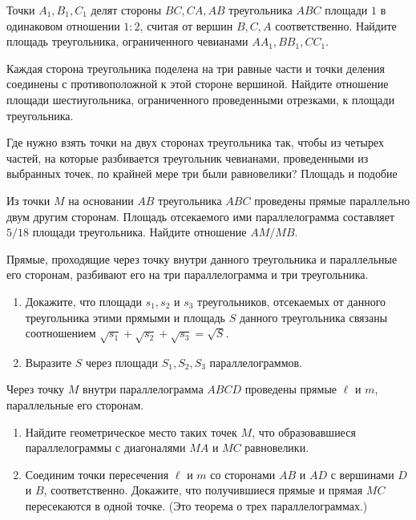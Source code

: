\documentclass{article}
\begin{document}
\begin{enumerate_boxed}
        \item Точки $A_1, B_1, C_1$ делят стороны $BC, CA, AB$ треугольника $ABC$ площади $1$ в одинаковом отношении $1:2$, считая от вершин $B, C, A$ соответственно.
        Найдите площадь треугольника, ограниченного чевианами $AA_1, BB_1, CC_1$.
        \item Каждая сторона треугольника поделена на три равные части и точки деления соединены с противоположной к этой стороне вершиной.
        Найдите отношение площади шестиугольника, ограниченного проведенными отрезками, к площади треугольника.
        \item Где нужно взять точки на двух сторонах треугольника так, чтобы из четырех частей, на которые разбивается треугольник чевианами, проведенными из выбранных точек, по крайней мере три были равновелики?
        Площадь и подобие
        \item Из точки $M$ на основании $AB$ треугольника $ABC$ проведены прямые параллельно двум другим сторонам.
        Площадь отсекаемого ими параллелограмма составляет $5/18$ площади треугольника.
        Найдите отношение $AM/MB$.
        \item Прямые, проходящие через точку внутри данного треугольника и параллельные его сторонам, разбивают его на три параллелограмма и три треугольника.
        \begin{enumerate}
            \item Докажите, что площади $s_1, s_2$ и $s_3$ треугольников, отсекаемых от данного треугольника этими прямыми и площадь $S$ данного треугольника связаны соотношением $\sqrt{s_1} + \sqrt{s_2} + \sqrt{s_3} = \sqrt{S}$.
            \item Выразите $S$ через площади $S_1, S_2, S_3$ параллелограммов.
        \end{enumerate}
        \item Через точку $M$ внутри параллелограмма $ABCD$ проведены прямые $\ell$ и $m$, параллельные его сторонам.
        \begin{enumerate}
            \item Найдите геометрическое место таких точек $M$, что образовавшиеся параллелограммы с диагоналями $MA$ и $MC$ равновелики.
            \item Соединим точки пересечения $\ell$ и $m$
            со сторонами $AB$ и $AD$ с вершинами $D$ и $B$, соответственно.
            Докажите, что получившиеся прямые и прямая $MC$ пересекаются в одной точке.
            (Это теорема о трех параллелограммах.)
        \end{enumerate}


\end{enumerate_boxed}
\end{document}

